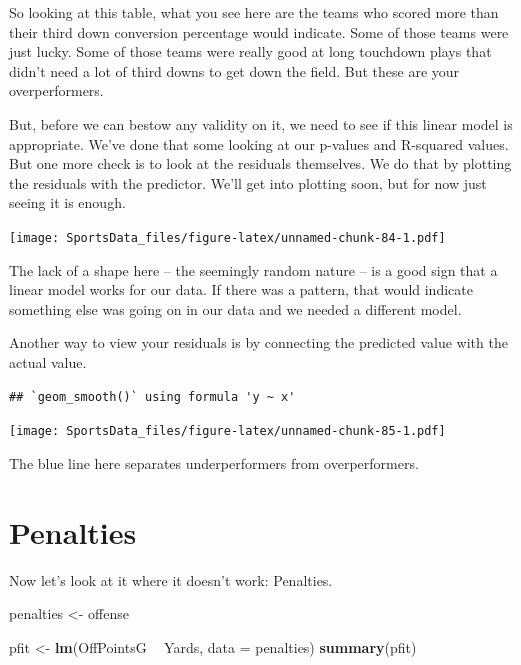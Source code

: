 \documentclass[]{book}
\newenvironment{Shaded}{\begin{snugshade}}{\end{snugshade}}
\newcommand{\DataTypeTok}[1]{\textcolor[rgb]{0.13,0.29,0.53}{#1}}
\newcommand{\KeywordTok}[1]{\textcolor[rgb]{0.13,0.29,0.53}{\textbf{#1}}}
\newcommand{\NormalTok}[1]{#1}
\newcommand{\OperatorTok}[1]{\textcolor[rgb]{0.81,0.36,0.00}{\textbf{#1}}}
\newcommand{\StringTok}[1]{\textcolor[rgb]{0.31,0.60,0.02}{#1}}
\begin{document}
So looking at this table, what you see here are the teams who scored more than their third down conversion percentage would indicate. Some of those teams were just lucky. Some of those teams were really good at long touchdown plays that didn't need a lot of third downs to get down the field. But these are your overperformers.

But, before we can bestow any validity on it, we need to see if this linear model is appropriate. We've done that some looking at our p-values and R-squared values. But one more check is to look at the residuals themselves. We do that by plotting the residuals with the predictor. We'll get into plotting soon, but for now just seeing it is enough.

\texttt{[image: SportsData\_files/figure-latex/unnamed-chunk-84-1.pdf]}

The lack of a shape here -- the seemingly random nature -- is a good sign that a linear model works for our data. If there was a pattern, that would indicate something else was going on in our data and we needed a different model.

Another way to view your residuals is by connecting the predicted value with the actual value.

\begin{verbatim}
## `geom_smooth()` using formula 'y ~ x'
\end{verbatim}

\texttt{[image: SportsData\_files/figure-latex/unnamed-chunk-85-1.pdf]}

The blue line here separates underperformers from overperformers.

\hypertarget{penalties}{%
\section{Penalties}\label{penalties}}

Now let's look at it where it doesn't work: Penalties.

\begin{Shaded}
\begin{Highlighting}[]
\NormalTok{penalties <-}\StringTok{ }\NormalTok{offense}
\end{Highlighting}
\end{Shaded}

\begin{Shaded}
\begin{Highlighting}[]
\NormalTok{pfit <-}\StringTok{ }\KeywordTok{lm}\NormalTok{(OffPointsG }\OperatorTok{~}\StringTok{ }\NormalTok{Yards, }\DataTypeTok{data =}\NormalTok{ penalties)}
\KeywordTok{summary}\NormalTok{(pfit)}
\end{Highlighting}
\end{Shaded}
\end{document}
